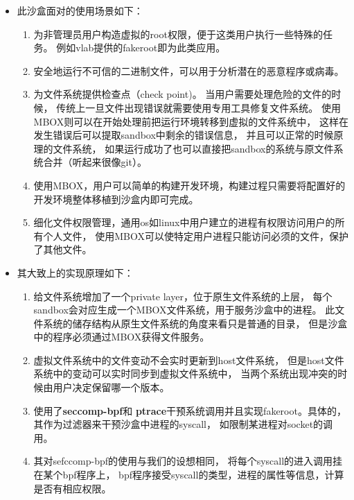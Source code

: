 \documentclass[AutoFakeBold,a4paper]{ctexart}
\begin{document}
\begin{itemize}
    \item 此沙盒面对的使用场景如下：
    \begin{enumerate}
        \item 为非管理员用户构造虚拟的root权限，便于这类用户执行一些特殊的任务。
        例如vlab提供的fakeroot即为此类应用。
        \item 安全地运行不可信的二进制文件，可以用于分析潜在的恶意程序或病毒。
        \item 为文件系统提供检查点（check point)。
        当用户需要处理危险的文件的时候，
        传统上一旦文件出现错误就需要使用专用工具修复文件系统。
        使用MBOX则可以在开始处理前把运行环境转移到虚拟的文件系统中，
        这样在发生错误后可以提取sandbox中剩余的错误信息，
        并且可以正常的时候原理的文件系统，
        如果运行成功了也可以直接把sandbox的系统与原文件系统合并（听起来很像git）。
        \item 使用MBOX，用户可以简单的构建开发环境，构建过程只需要将配置好的开发环境整体移植到沙盒内即可完成。
        \item 细化文件权限管理，通用os如linux中用户建立的进程有权限访问用户的所有个人文件，
        使用MBOX可以使特定用户进程只能访问必须的文件，保护了其他文件。
    \end{enumerate}
    \item 其大致上的实现原理如下：
    \begin{enumerate}
        \item 给文件系统增加了一个private layer，位于原生文件系统的上层，
        每个sandbox会对应生成一个MBOX文件系统，用于服务沙盒中的进程。
        此文件系统的储存结构从原生文件系统的角度来看只是普通的目录，
        但是沙盒中的程序必须通过MBOX获得文件服务。
        \item 虚拟文件系统中的文件变动不会实时更新到host文件系统，
        但是host文件系统中的变动可以实时同步到虚拟文件系统中，
        当两个系统出现冲突的时候由用户决定保留哪一个版本。
        \item 使用了\textbf{seccomp-bpf}和
        \textbf{ptrace}干预系统调用并且实现fakeroot。具体的，其作为过滤器来干预沙盒中进程的syscall，
        如限制某进程对socket的调用。
        \item 其对sefccomp-bpf的使用与我们的设想相同，
        将每个syscall的进入调用挂在某个bpf程序上，
        bpf程序接受syscall的类型，进程的属性等信息，计算是否有相应权限。
    \end{enumerate}
    
\end{itemize}
\end{document}
